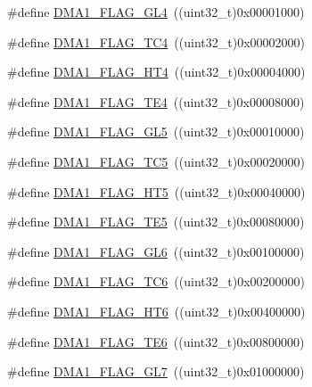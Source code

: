 \begin{DoxyCompactItemize}
\item 
\#define \hyperlink{group___d_m_a__flags__definition_gace751c9c8aa57b154d61865625cca25b}{D\+M\+A1\+\_\+\+F\+L\+A\+G\+\_\+\+G\+L4}~((uint32\+\_\+t)0x00001000)
\item 
\#define \hyperlink{group___d_m_a__flags__definition_ga78f2798eca161493d5dc6058f65b0f17}{D\+M\+A1\+\_\+\+F\+L\+A\+G\+\_\+\+T\+C4}~((uint32\+\_\+t)0x00002000)
\item 
\#define \hyperlink{group___d_m_a__flags__definition_ga12ad5a2c8cd9778fecf88d1dab7626d4}{D\+M\+A1\+\_\+\+F\+L\+A\+G\+\_\+\+H\+T4}~((uint32\+\_\+t)0x00004000)
\item 
\#define \hyperlink{group___d_m_a__flags__definition_ga53beafec27ed89735e83fc7577a00d39}{D\+M\+A1\+\_\+\+F\+L\+A\+G\+\_\+\+T\+E4}~((uint32\+\_\+t)0x00008000)
\item 
\#define \hyperlink{group___d_m_a__flags__definition_ga173d8dadcbf3d96911a43eedf53bd64e}{D\+M\+A1\+\_\+\+F\+L\+A\+G\+\_\+\+G\+L5}~((uint32\+\_\+t)0x00010000)
\item 
\#define \hyperlink{group___d_m_a__flags__definition_ga438d3577b5b5b6c2c0cf1008296c23bb}{D\+M\+A1\+\_\+\+F\+L\+A\+G\+\_\+\+T\+C5}~((uint32\+\_\+t)0x00020000)
\item 
\#define \hyperlink{group___d_m_a__flags__definition_ga648a2eb0b008ab009f03d207596c3cd7}{D\+M\+A1\+\_\+\+F\+L\+A\+G\+\_\+\+H\+T5}~((uint32\+\_\+t)0x00040000)
\item 
\#define \hyperlink{group___d_m_a__flags__definition_ga17b9793d2f78c683f7c48ba4f7fa2e70}{D\+M\+A1\+\_\+\+F\+L\+A\+G\+\_\+\+T\+E5}~((uint32\+\_\+t)0x00080000)
\item 
\#define \hyperlink{group___d_m_a__flags__definition_gab21d0196f89435f61bedd03d53edc093}{D\+M\+A1\+\_\+\+F\+L\+A\+G\+\_\+\+G\+L6}~((uint32\+\_\+t)0x00100000)
\item 
\#define \hyperlink{group___d_m_a__flags__definition_ga85276600ddf436d4f268199e0df9c54a}{D\+M\+A1\+\_\+\+F\+L\+A\+G\+\_\+\+T\+C6}~((uint32\+\_\+t)0x00200000)
\item 
\#define \hyperlink{group___d_m_a__flags__definition_ga0d594cb12f86f19c9562d82c3ca505bc}{D\+M\+A1\+\_\+\+F\+L\+A\+G\+\_\+\+H\+T6}~((uint32\+\_\+t)0x00400000)
\item 
\#define \hyperlink{group___d_m_a__flags__definition_ga231e156a0e27f7b2271ea44ca90c237d}{D\+M\+A1\+\_\+\+F\+L\+A\+G\+\_\+\+T\+E6}~((uint32\+\_\+t)0x00800000)
\item 
\#define \hyperlink{group___d_m_a__flags__definition_ga37e5e27ca5bf6f3211d2effda2ca7646}{D\+M\+A1\+\_\+\+F\+L\+A\+G\+\_\+\+G\+L7}~((uint32\+\_\+t)0x01000000)

\end{DoxyCompactItemize}
